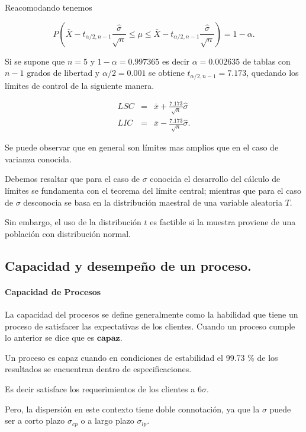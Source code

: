 \documentclass[english]{report}
\begin{document}
Reacomodando tenemos

\begin{equation}
P(\bar{X}-t_{\alpha/2,n-1} \frac{\hat{\sigma}}{\sqrt{n}} \leq \mu \leq \bar{X}-t_{\alpha/2,n-1} \frac{\hat{\sigma}}{\sqrt{n}}) = 1-\alpha.
\label{c2eq9}
\end{equation}


Si se supone que $n = 5$ y $1-\alpha = 0.997365$ es decir $\alpha = 0.002635$ de tablas con $n-1$ grados de libertad y $\alpha/2 = 0.001$ se obtiene $t_{\alpha/2,n-1} = 7.173$, quedando los límites de control de la siguiente manera.

\begin{eqnarray*}
LSC & = & \bar{x}+\frac{7.173}{\sqrt{n}}\hat{\sigma}\\
LIC & = & \bar{x}-\frac{7.173}{\sqrt{n}}\hat{\sigma}.
\end{eqnarray*}

Se puede observar que en general son límites mas amplios que en el caso de varianza conocida. 

Debemos resaltar que para el caso de $\sigma$ conocida el desarrollo del cálculo de límites se fundamenta con el teorema del límite central; mientras que para el caso de $\sigma$ desconocia se basa en la distribución maestral de una variable aleatoria $T$. 

Sin embargo, el uso de la distribución $t$ es factible si la muestra proviene de una población con distribución normal. 

\subsection{Capacidad y desempeño de un proceso. }


\paragraph{Capacidad de Procesos}

La capacidad del procesos se define generalmente como la
habilidad que tiene un proceso de satisfacer las expectativas de los
clientes. Cuando un proceso cumple lo anterior se dice que es $\textbf{capaz}$.

Un proceso es capaz cuando en condiciones de estabilidad el 99.73
\% de los resultados se encuentran dentro de especificaciones.

Es decir satisface los requerimientos de los clientes a $6\sigma$.

Pero, la dispersión en este contexto tiene doble connotación, ya que la $\sigma$ puede ser
a corto plazo $\sigma_{cp}$ o a largo plazo $\sigma_{lp}$.
\end{document}
